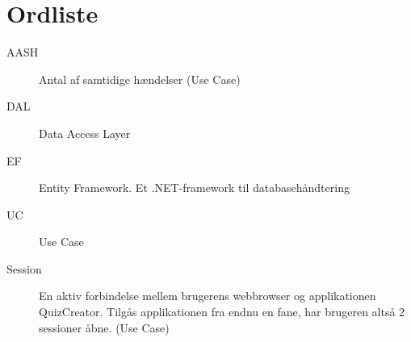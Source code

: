 \chapter{Ordliste}\label{head:ordliste}




\begin{description}
\item[AASH] Antal af samtidige hændelser (Use Case)
\item[DAL] Data Access Layer
\item[EF] Entity Framework. Et .NET-framework til databasehåndtering
\item[UC] Use Case
\item[Session] En aktiv forbindelse mellem brugerens webbrowser og applikationen QuizCreator. Tilgås applikationen fra endnu en fane, har brugeren altså 2 sessioner åbne. (Use Case)

\end{description}